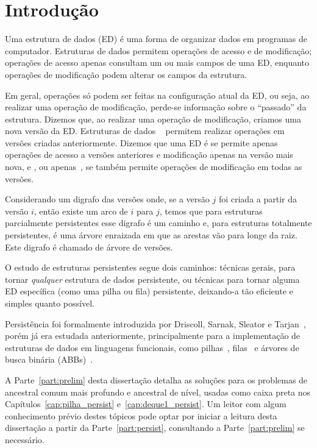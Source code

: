 \documentclass[main.tex]{subfiles}
\begin{document}
\setcounter{secnumdepth}{0}

\chapter*{Introdução}

Uma estrutura de dados (ED) é uma forma de organizar dados em programas de computador. Estruturas de dados permitem operações de acesso e de modificação; operações de acesso apenas consultam um ou mais campos de uma ED, enquanto operações de modificação podem alterar os campos da estrutura.

Em geral, operações só podem ser feitas na configuração atual da ED, ou seja, ao realizar uma operação de modificação, perde-se informação sobre o ``passado'' da estrutura. Dizemos que, ao realizar uma operação de modificação, criamos uma nova versão da ED. Estruturas de dados ~\cite{DriscollSST1989} permitem realizar operações em versões criadas anteriormente. Dizemos que uma ED é  se permite apenas operações de acesso a versões anteriores e modificação apenas na versão mais nova, e , ou apenas~, se também permite operações de modificação em todas as versões.

Considerando um digrafo das versões onde, se a versão $j$ foi criada a partir da versão $i$, então existe um arco de $i$ para $j$, temos que para estruturas parcialmente persistentes esse digrafo é um caminho e, para estruturas totalmente persistentes, é uma árvore enraizada em que as arestas vão para longe da raiz. Este digrafo é chamado de árvore de versões.

O estudo de estruturas persistentes segue dois caminhos: técnicas gerais, para tornar \emph{qualquer} estrutura de dados persistente, ou técnicas para tornar alguma ED específica (como uma pilha ou fila) persistente, deixando-a tão eficiente e simples quanto possível.

Persistência foi formalmente introduzida por Driscoll, Sarnak, Sleator e Tarjan~\cite{DriscollSST1989}, porém já era estudada anteriormente, principalmente para a implementação de estruturas de dados em linguagens funcionais, como pilhas~\cite{Myers83}, filas~\cite{HoodMelville} e árvores de busca binária (ABBs)~\cite{Myers82}.

A Parte~\ref{part:prelim} desta dissertação detalha as soluções para os problemas de ancestral comum mais profundo e ancestral de nível, usadas como caixa preta nos Capítulos~\ref{cap:pilha_persist} e~\ref{cap:deque1_persist}. Um leitor com algum conhecimento prévio destes tópicos pode optar por iniciar a leitura desta dissertação a partir da Parte~\ref{part:persist}, consultando a Parte~\ref{part:prelim} se necessário.
\end{document}
